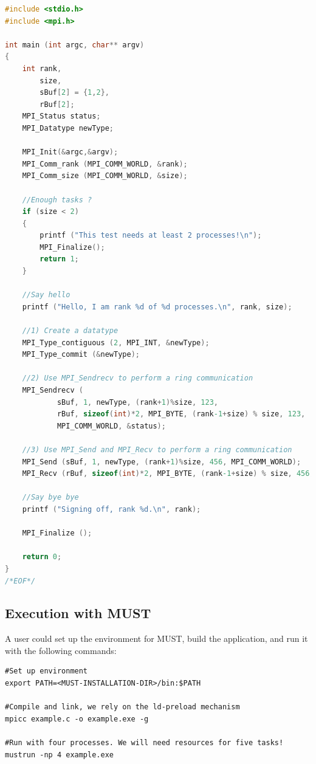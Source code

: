 \documentclass[english]{scrartcl}
\begin{document}
\begin{lstlisting}[tabsize=3,numbers=none,basicstyle=\scriptsize,%
	breaklines=true,language=C, frame=single,%
	commentstyle=\color{LGREY},
    keywordstyle=\bfseries,%
	identifierstyle=\texttt,
    numbers=left, numbersep=5pt,numberstyle=\tiny,%
	name=example-interface-listing, firstnumber=1, showspaces=false, showstringspaces=false]
#include <stdio.h>
#include <mpi.h>

int main (int argc, char** argv)
{
    int rank,
        size,
        sBuf[2] = {1,2},
        rBuf[2];
    MPI_Status status;
    MPI_Datatype newType;

    MPI_Init(&argc,&argv);
    MPI_Comm_rank (MPI_COMM_WORLD, &rank);
    MPI_Comm_size (MPI_COMM_WORLD, &size);

    //Enough tasks ?
	if (size < 2)
	{
		printf ("This test needs at least 2 processes!\n");
		MPI_Finalize();
		return 1;
	}

	//Say hello
	printf ("Hello, I am rank %d of %d processes.\n", rank, size);

	//1) Create a datatype
	MPI_Type_contiguous (2, MPI_INT, &newType);
	MPI_Type_commit (&newType);

	//2) Use MPI_Sendrecv to perform a ring communication
	MPI_Sendrecv (
	        sBuf, 1, newType, (rank+1)%size, 123,
	        rBuf, sizeof(int)*2, MPI_BYTE, (rank-1+size) % size, 123,
	        MPI_COMM_WORLD, &status);

	//3) Use MPI_Send and MPI_Recv to perform a ring communication
	MPI_Send (sBuf, 1, newType, (rank+1)%size, 456, MPI_COMM_WORLD);
	MPI_Recv (rBuf, sizeof(int)*2, MPI_BYTE, (rank-1+size) % size, 456, MPI_COMM_WORLD, &status);

	//Say bye bye
	printf ("Signing off, rank %d.\n", rank);

    MPI_Finalize ();

    return 0;
}
/*EOF*/
\end{lstlisting}

\subsection{Execution with MUST}

A user could set up the environment for MUST, build the application, and run
it with the following commands:

\begin{verbatim}
#Set up environment
export PATH=<MUST-INSTALLATION-DIR>/bin:$PATH

#Compile and link, we rely on the ld-preload mechanism
mpicc example.c -o example.exe -g

#Run with four processes. We will need resources for five tasks!
mustrun -np 4 example.exe
\end{verbatim}
\end{document}
